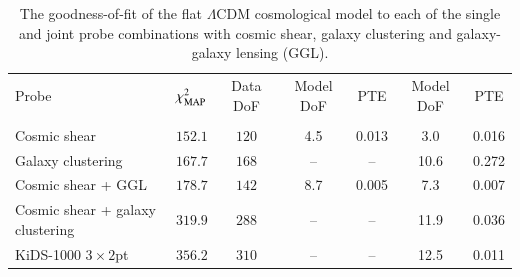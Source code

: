 \begin{table}
	\begin{center}
		\caption{The goodness-of-fit of the flat $\Lambda$CDM cosmological model to each of the single and joint probe combinations with cosmic shear, galaxy clustering and galaxy-galaxy lensing (GGL).}
		\label{tab:goodness-of-fit}
\begin{tabular}{lcccccc}
    \toprule
    Probe             & $\chi^2_{\rm MAP}$  & Data DoF  & Model DoF                   & PTE  & Model DoF          & PTE    \\
                      &                     &           &\citep{joachimi/etal:inprep} &      & \citep{Raveri2019} & \\
    \midrule
	Cosmic shear     & $152.1$ & $120$  &4.5 & 0.013 &3.0 & 0.016 \\
	Galaxy clustering & $167.7$ & $168$  &-- & -- &10.6 & 0.272 \\
	Cosmic shear + GGL & $178.7$ & $142$  &8.7 & 0.005 &7.3 & 0.007 \\
	Cosmic shear + galaxy clustering & $319.9$ & $288$  &-- & -- &11.9 & 0.036 \\
	KiDS-1000 $3\times2$pt & $356.2$ & $310$  &-- & -- &12.5 & 0.011 \\

    \bottomrule
\end{tabular}
	\end{center}
\end{table}



